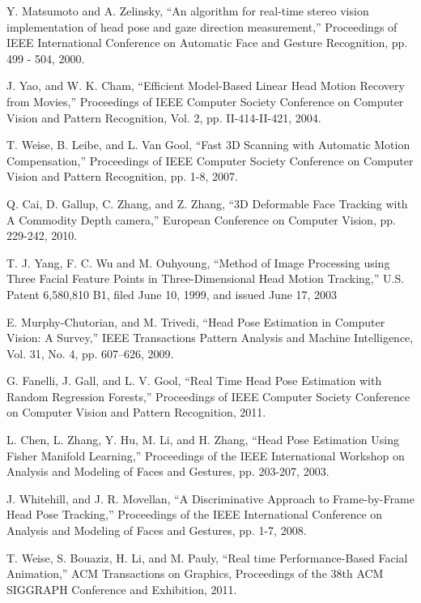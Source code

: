 \begin{thebibliography}{}
Y. Matsumoto and A. Zelinsky, “An algorithm for real-time stereo vision implementation of head pose and gaze direction measurement,” Proceedings of IEEE International Conference on Automatic Face and Gesture Recognition, pp. 499 - 504, 2000.

J. Yao, and W. K. Cham, “Efficient Model-Based Linear Head Motion Recovery from Movies,” Proceedings of IEEE Computer Society Conference on Computer Vision and Pattern Recognition, Vol. 2, pp. II-414-II-421,  2004.

T. Weise, B. Leibe, and L. Van Gool, “Fast 3D Scanning with Automatic Motion Compensation,” Proceedings of IEEE Computer Society Conference on Computer Vision and Pattern Recognition, pp. 1-8, 2007.

Q. Cai, D. Gallup, C. Zhang, and Z. Zhang, “3D Deformable Face Tracking with A Commodity Depth camera,” European Conference on Computer Vision, pp. 229-242, 2010.

T. J. Yang, F. C. Wu and M. Ouhyoung, “Method of Image Processing using Three Facial Feature Points in Three-Dimensional Head Motion Tracking,” U.S. Patent 6,580,810 B1, filed June 10, 1999, and issued June 17, 2003

E. Murphy-Chutorian, and M. Trivedi, “Head Pose Estimation in Computer Vision: A Survey,” IEEE Transactions Pattern Analysis and Machine Intelligence, Vol. 31, No. 4, pp. 607–626,  2009.

G. Fanelli, J. Gall, and L. V. Gool, “Real Time Head Pose Estimation with Random Regression Forests,” Proceedings of IEEE Computer Society Conference on Computer Vision and Pattern Recognition, 2011.

L. Chen, L. Zhang, Y. Hu, M. Li, and H. Zhang, “Head Pose Estimation Using Fisher Manifold Learning,” Proceedings of the IEEE International Workshop on Analysis and Modeling of Faces and Gestures, pp. 203-207, 2003.
 
J. Whitehill, and J. R. Movellan, “A Discriminative Approach to Frame-by-Frame Head Pose Tracking,” Proceedings of the IEEE International Conference on Analysis and Modeling of Faces and Gestures, pp. 1-7, 2008.

T. Weise, S. Bouaziz, H. Li, and M. Pauly, “Real time Performance-Based Facial Animation,” ACM Transactions on Graphics, Proceedings of the 38th ACM SIGGRAPH Conference and Exhibition, 2011.


\end{thebibliography}
